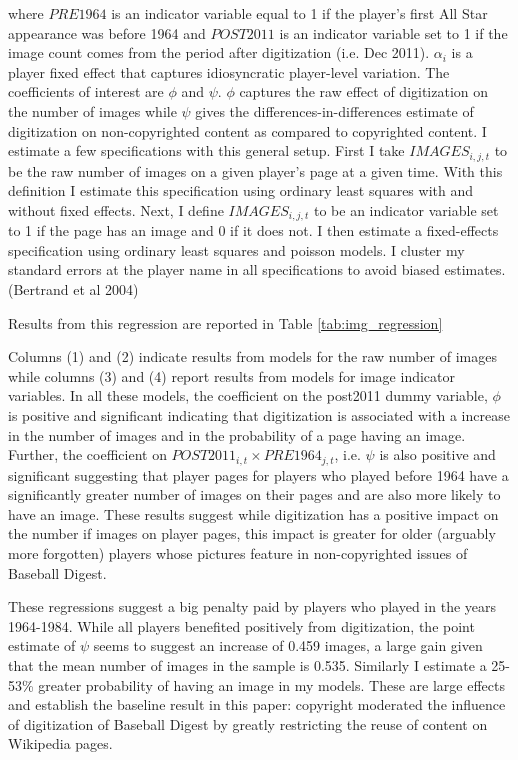 \documentclass[12pt]{article}
\begin{document}
where $PRE1964$ is an indicator variable equal to 1 if the player's first All Star appearance was before 1964 and $POST2011$ is an indicator variable set to 1 if the image count comes from the period after digitization (i.e. Dec 2011). $\alpha_i$ is a player fixed effect that captures idiosyncratic player-level variation. The coefficients of interest are $\phi$ and $\psi$. $\phi$ captures the raw effect of digitization on the number of images while $\psi$ gives the differences-in-differences estimate of digitization on non-copyrighted content as compared to copyrighted content. I estimate a few specifications with this general setup. First I take $IMAGES_{i,j,t}$ to be the raw number of images on a given player's page at a given time. With this definition I estimate this specification using ordinary least squares with and without fixed effects. Next, I define $IMAGES_{i,j,t}$ to be an indicator variable set to 1 if the page has an image and 0 if it does not. I then estimate a fixed-effects specification using ordinary least squares and poisson models. I cluster my standard errors at the player name in all specifications to avoid biased estimates. (Bertrand et al 2004)

Results from this regression are reported in Table \ref{tab:img_regression}

\label{tab:img_regression}


Columns (1) and (2) indicate results from models for the raw number of images while columns (3) and (4) report results from models for image indicator variables. In all these models, the coefficient on the post2011 dummy variable, $\phi$ is positive and significant indicating that digitization is associated with a increase in the number of images and in the probability of a page having an image. Further, the coefficient on $POST2011_{i,t} \times PRE1964_{j,t}$, i.e. $\psi$ is also positive and significant suggesting that player pages for players who played before 1964 have a significantly greater number of images on their pages and are also more likely to have an image. These results suggest while digitization has a positive impact on the number if images on player pages, this impact is greater for older (arguably more forgotten) players whose pictures feature in non-copyrighted issues of Baseball Digest. 

These regressions suggest a big penalty paid by players who played in the years 1964-1984. While all players benefited positively from digitization, the point estimate of $\psi$ seems to suggest an increase of 0.459 images, a large gain given that the mean number of images in the sample is 0.535. Similarly I estimate a 25-53\% greater probability of having an image in my models. These are large effects and establish the baseline result in this paper: copyright moderated the influence of digitization of Baseball Digest by greatly restricting the reuse of content on Wikipedia pages.
\end{document}
